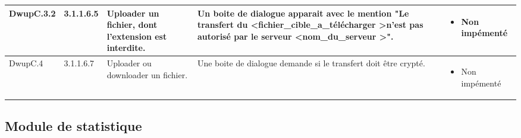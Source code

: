 \documentclass[10pt,a4paper,landscape]{report}
\begin{document}
\begin{center}
\begin{tabular}{|p{2.5cm}|p{2cm}|p{8cm}|p{8cm}|p{5cm}|}
		DwupC.3.2 & 3.1.1.6.5 & Uploader un fichier, dont l'extension est interdite. & Un boite de dialogue apparait avec le mention "Le transfert du \textless fichier\_cible\_a\_télécharger \textgreater n'est pas autorisé par le serveur \textless nom\_du\_serveur \textgreater". &\vspace*{-0.2cm} \begin{itemize}[label=$\ast$] \item \textcolor{false}{Non impémenté}\end{itemize}
 \\
		\hline
		DwupC.4 & 3.1.1.6.7 & Uploader ou downloader un fichier. & Une boite de dialogue demande si le transfert doit être crypté. & \vspace*{-0.2cm} \begin{itemize}[label=$\ast$] \item \textcolor{false}{Non impémenté}\end{itemize}
\\		
		\hline	
	\end{tabular}
	\egroup
\end{center}

\subsection{Module de statistique}
\end{document}
